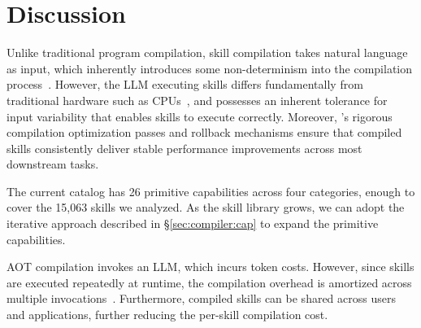 \section{Discussion}
\label{sec:discussion}

Unlike traditional program compilation, skill compilation takes natural language as input,
which inherently introduces some non-determinism into the compilation process~\cite{wang2023selfconsistency}.
However, the LLM executing skills differs fundamentally from traditional hardware such as CPUs~\cite{hennessy2019architecture},
and possesses an inherent tolerance for input variability that enables skills to execute correctly.
Moreover, \sys's rigorous compilation optimization passes and rollback mechanisms ensure
that compiled skills consistently deliver stable performance improvements across most downstream tasks.


The current catalog has 26 primitive capabilities across four categories,
enough to cover the 15,063 skills we analyzed. 
As the skill library grows, we can adopt the iterative approach described in \S\ref{sec:compiler:cap} to expand the primitive capabilities.

AOT compilation invokes an LLM, which incurs token costs. 
However, since skills are executed repeatedly at runtime,
the compilation overhead is amortized across multiple invocations~\cite{gray1981transaction}.
Furthermore, compiled skills can be shared across users and applications, further reducing the per-skill compilation cost.

